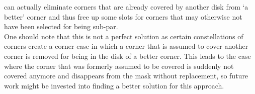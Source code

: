 can actually eliminate corners that are already covered by another disk from `a better' corner and
thus free up some slots for corners that may otherwise not have been selected for being sub-par.\\
One should note that this is not a perfect solution as certain constellations of corners create
a corner case in which a corner that is assumed to cover another corner is removed for being in the
disk of a better corner. This leads to the case where the corner that was formerly assumed to be
covered is suddenly not covered anymore and disappears from the mask without replacement, so future
work might be invested into finding a better solution for this approach.


